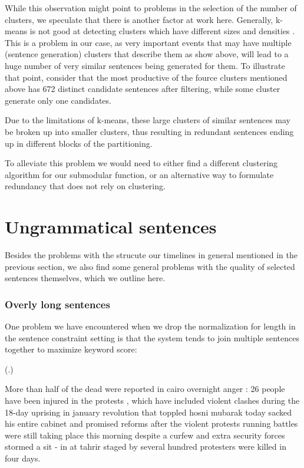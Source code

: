 \documentclass[a4paper,BCOR=10mm]{report}
\newcounter{quotecount}[chapter]
\newcommand{\countquote}[1]{\vspace{1cm}\refstepcounter{quotecount}%
     (\thechapter.\arabic{quotecount}) \hspace*{1cm} \parbox{9cm}{#1}\\[1cm]}
\numberwithin{lemma}{chapter}
\numberwithin{definition}{chapter}
\begin{document}
While this observation might point to problems in the selection of the number of clusters, we speculate that there is another factor at work here.
Generally, k-means is not good at detecting clusters which have different sizes and densities \citep{introduction-data-mining-tan}.
This is a problem in our case, as very important events that may have multiple (sentence generation) clusters that describe them as show above, will lead to a huge number of very similar sentences being generated for them. To illustrate that point, consider that the most productive of the fource clusters mentioned above has 672 distinct candidate sentences after filtering, while some cluster generate only one candidates.

Due to the limitations of k-means, these large clusters of similar sentences may be broken up into smaller clusters, thus resulting in redundant sentences ending up in different blocks of the partitioning.

To alleviate this problem we would need to either find a different clustering algorithm for our submodular function, or an alternative way to formulate redundancy that does not rely on clustering.

\section{Ungrammatical sentences} \label{sec:errors-grammar}

Besides the problems with the strucute our timelines in general mentioned in the previous section, we also find some general problems with the quality of selected sentences themselves, which we outline here.

\subsubsection{Overly long sentences}

One problem we have encountered when we drop the normalization for length in the sentence constraint setting is that the system tends to join multiple sentences together to maximize keyword score:

\countquote{
More than half of the dead were reported in cairo overnight anger : 26 people have been injured in the protests , which have included violent clashes during the 18-day uprising in january revolution that toppled hosni mubarak today sacked his entire cabinet and promised reforms after the violent protests running battles were still taking place this morning despite a curfew and extra security forces stormed a sit - in at tahrir staged by several hundred protesters were killed in four days.
}
\end{document}
